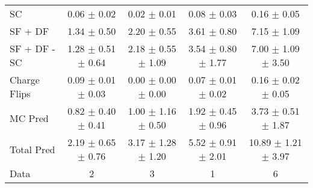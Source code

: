 \begin{tabular}{l|cccc}
                                 SC &  0.06 $\pm$  0.02 &  0.02 $\pm$  0.01 &  0.08 $\pm$  0.03 &  0.16 $\pm$  0.05 \\
                            SF + DF &  1.34 $\pm$  0.50 &  2.20 $\pm$  0.55 &  3.61 $\pm$  0.80 &  7.15 $\pm$  1.09 \\
\hline
                       SF + DF - SC &  1.28 $\pm$  0.51 $\pm$  0.64 &  2.18 $\pm$  0.55 $\pm$  1.09 &  3.54 $\pm$  0.80 $\pm$  1.77 &  7.00 $\pm$  1.09 $\pm$  3.50 \\
\hline\hline
                       Charge Flips &  0.09 $\pm$  0.01 $\pm$  0.03 &  0.00 $\pm$  0.00 $\pm$  0.00 &  0.07 $\pm$  0.01 $\pm$  0.02 &  0.16 $\pm$  0.02 $\pm$  0.05 \\
\hline
                            MC Pred &  0.82 $\pm$  0.40 $\pm$  0.41 &  1.00 $\pm$  1.16 $\pm$  0.50 &  1.92 $\pm$  0.45 $\pm$  0.96 &  3.73 $\pm$  0.51 $\pm$  1.87 \\
\hline
                         Total Pred &  2.19 $\pm$  0.65 $\pm$  0.76 &  3.17 $\pm$  1.28 $\pm$  1.20 &  5.52 $\pm$  0.91 $\pm$  2.01 & 10.89 $\pm$  1.21 $\pm$  3.97 \\
\hline\hline
                               Data &     2 &     3 &     1 &     6 \\
\hline\hline
\end{tabular}

